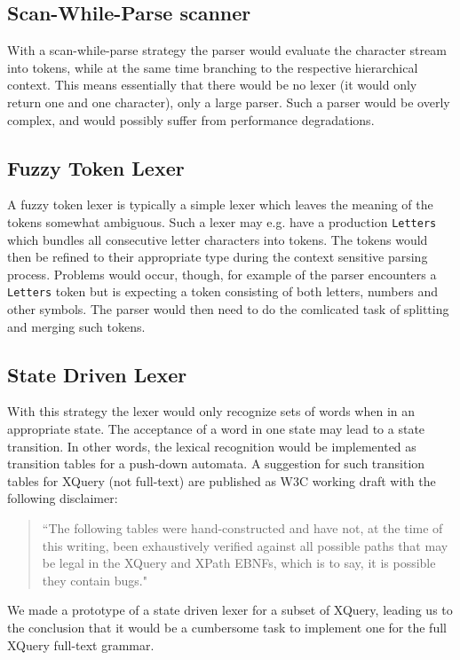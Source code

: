\subsection{Scan-While-Parse scanner}
\label{sect:ambiguousgrammar:scanWhileParse}
With a scan-while-parse strategy the parser would evaluate the character stream
into tokens, while at the same time branching to the respective hierarchical
context. This means essentially that there would be no lexer (it would only
return one and one character), only a large parser. Such a parser would be
overly complex, and would possibly suffer from performance degradations.

\subsection{Fuzzy Token Lexer}
A fuzzy token lexer is typically a simple lexer which leaves the meaning of the
tokens somewhat ambiguous. Such a lexer may e.g. have a production
\verb!Letters! which bundles all consecutive letter characters into tokens. The
tokens would then be refined to their appropriate type during the context
sensitive parsing process. Problems would occur, though, for example of the
parser encounters a \verb!Letters! token but is expecting a token consisting of
both letters, numbers and other symbols. The parser would then need to do the
comlicated task of splitting and merging such tokens.    

\subsection{State Driven Lexer}
\label{sect:amiguousgrammar:stateDriven}
With this strategy the lexer would only recognize sets of words when in an
appropriate state. The acceptance of a word in one state may lead to a state
transition. In other words, the lexical recognition would be implemented as
transition tables for a push-down automata. A suggestion for such transition
tables for XQuery (not full-text) are published as W3C working
draft\cite{createTokenizer} with the following disclaimer:  

\begin{quote}
``The following tables were hand-constructed and have not, at the time of this writing, been exhaustively verified against all possible paths that may be legal in the XQuery and XPath EBNFs, which is to say, it is possible they contain bugs."
\end{quote}
We made a prototype of a state driven lexer for a subset of XQuery, leading us
to the conclusion that it would be a cumbersome task to implement one for the
full XQuery full-text grammar. 

